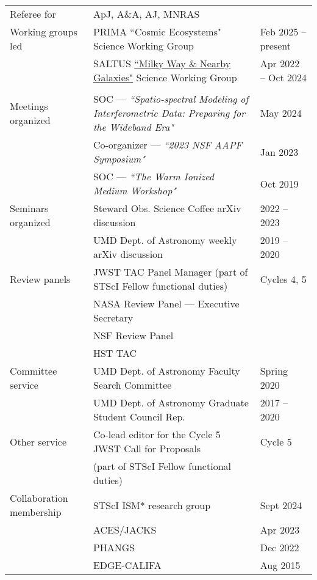 \documentclass[11pt]{article}
\begin{document}
\begin{longtable}{p{} p{} p{}}

Referee for & ApJ, A\&A, AJ, MNRAS \medskip & \\

Working groups led & PRIMA ``Cosmic Ecosystems" Science Working Group & {\small Feb 2025 -- present}\\
& SALTUS \href{https://ui.adsabs.harvard.edu/abs/2024JATIS..10d2304L/abstract}{``Milky Way \& Nearby Galaxies"} Science Working Group & {\small Apr 2022 -- Oct 2024}\\ \medskip\\

Meetings organized & SOC --- \textit{``Spatio-spectral Modeling of Interferometric Data: Preparing for the Wideband Era"} & {\small May 2024}\\
 & Co-organizer --- \textit{``2023 NSF AAPF Symposium"} & {\small Jan 2023}\\
 & SOC --- \textit{``The Warm Ionized Medium Workshop"} & {\small Oct 2019} \medskip\\

Seminars organized & Steward Obs. Science Coffee arXiv discussion & {\small 2022 -- 2023}\\
& UMD Dept. of Astronomy weekly arXiv discussion & \small{2019 -- 2020}\medskip\\

Review panels & JWST TAC Panel Manager \small{(part of STScI Fellow functional duties)} & {\small Cycles 4, 5}\\
& NASA Review Panel --- Executive Secretary &\\
& NSF Review Panel &\\
& HST TAC\medskip & \\

Committee service & UMD Dept. of Astronomy Faculty Search Committee & {\small Spring 2020}\\
& UMD Dept. of Astronomy Graduate Student Council Rep. & {\small 2017 -- 2020}\medskip\\

Other service & Co-lead editor for the Cycle 5 JWST Call for Proposals & {\small Cycle 5} \\
&  \small{(part of STScI Fellow functional duties)}  \medskip &\\

Collaboration  membership& STScI ISM* research group & {\small Sept 2024}\\
& ACES/JACKS & {\small Apr 2023}\\
 & PHANGS & {\small Dec 2022}\\
& EDGE-CALIFA & {\small Aug 2015}\medskip\\


\end{longtable}
\end{document}
